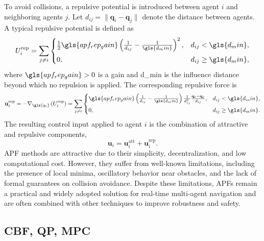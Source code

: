 To avoid collisions, a repulsive potential is introduced between agent $i$
and neighboring agents $j$. Let $d_{ij} = \| \mathbf{q}_i - \mathbf{q}_j \|$ denote the distance
between agents. A typical repulsive potential is defined as
\begin{equation}
    U_i^{\mathrm{rep}} =
    \sum_{j \neq i}
    \begin{cases}
        \frac{1}{2} \gls{apf_rep_gain} 
        \left( \frac{1}{d_{ij}} - \frac{1}{\gls{d_min}} \right)^2,
        & d_{ij} < \gls{d_min}, \\[6pt]
        0, & d_{ij} \ge \gls{d_min},
    \end{cases}
\end{equation}
where $\gls{apf_rep_gain} > 0$ is a gain and \gls{d_min} is the influence distance
beyond which no repulsion is applied.
The corresponding repulsive force is
\begin{equation}
    \mathbf{u}_i^{\mathrm{rep}} =
    - \nabla_{\gls{q_i}} \left( U_i^{\mathrm{rep}} \right) =
    \sum_{j \neq i}
    \begin{cases}
        \gls{apf_rep_gain}
        \left( \frac{1}{d_{ij}} - \frac{1}{\gls{d_min}} \right)
        \frac{1}{d_{ij}^2}
        \frac{\mathbf{q}_i - \mathbf{q}_j}{d_{ij}},
        & d_{ij} < \gls{d_min}, \\[6pt]
        0, & d_{ij} \ge \gls{d_min}.
    \end{cases}
\end{equation}
The resulting control input applied to agent $i$ is the combination of
attractive and repulsive components,
\begin{equation}
    \mathbf{u}_i = \mathbf{u}_i^{\mathrm{att}} + \mathbf{u}_i^{\mathrm{rep}}.
\end{equation}
\gls{APF} methods are attractive due to their simplicity, decentralization, and low computational cost. However, they suffer from well-known limitations, including the presence of local minima, oscillatory behavior near obstacles, and the lack of formal guarantees on collision avoidance. Despite these limitations, APFs remain a practical and widely adopted solution  \cite{Litimein2021} for real-time multi-agent navigation and are often combined with other techniques to improve robustness and safety.

\subsection{CBF, QP, MPC} \label{sec.3:CBF_QP_MPC}

